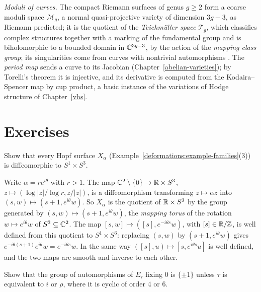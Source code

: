 \begin{remark}\label{deformations:remark-moduli-curves}
\emph{Moduli of curves.} The compact Riemann surfaces of genus $g \geq 2$ form a coarse moduli space $\mathcal{M}_g$, a normal quasi-projective variety of dimension $3g - 3$, as Riemann predicted; it is
the quotient of the \emph{Teichm\"uller space} $\mathcal{T}_g$, which classifies complex structures together with a marking of the fundamental group and is biholomorphic to a bounded domain in $\mathbb{C}^{3g - 3}$,
by the action of the \emph{mapping class group}; its singularities come from curves with nontrivial automorphisms \cite{harris-morrison}. The \emph{period map} sends a curve to its Jacobian
(Chapter~\ref{abelian-varieties}); by Torelli's theorem it is injective, and its derivative is computed from the Kodaira--Spencer map by cup product, a basic instance of the variations of Hodge structure
of Chapter~\ref{vhs}.
\end{remark}

\section{Exercises}\label{deformations:section-exercises}

\begin{exercise}\label{deformations:exercise-hopf}
Show that every Hopf surface $X_\alpha$ (Example~\ref{deformations:example-families}(3)) is diffeomorphic to $S^1 \times S^3$.
\end{exercise}

\begin{solution}
Write $\alpha = re^{i\theta}$ with $r > 1$. The map $\mathbb{C}^2 \setminus \{0\} \to \mathbb{R} \times S^3$, $z \mapsto (\log|z|/\log r, z/|z|)$, is a diffeomorphism transforming $z \mapsto \alpha z$ into
$(s, w) \mapsto (s + 1, e^{i\theta}w)$. So $X_\alpha$ is the quotient of $\mathbb{R} \times S^3$ by the group generated by $(s, w) \mapsto (s + 1, e^{i\theta}w)$, the \emph{mapping torus} of the rotation $w \mapsto e^{i\theta}w$ of $S^3 \subseteq \mathbb{C}^2$.
The map $[s, w] \mapsto ([s], e^{-i\theta s}w)$, with $[s] \in \mathbb{R}/\mathbb{Z}$, is well defined from this quotient to $S^1 \times S^3$: replacing $(s, w)$ by $(s + 1, e^{i\theta}w)$ gives
$e^{-i\theta(s + 1)}e^{i\theta}w = e^{-i\theta s}w$. In the same way $([s], u) \mapsto [s, e^{i\theta s}u]$ is well defined, and the two maps are smooth and inverse to each other.
\end{solution}

\begin{exercise}\label{deformations:exercise-automorphisms-elliptic}
Show that the group of automorphisms of $E_\tau$ fixing $0$ is $\{\pm1\}$ unless $\tau$ is equivalent to $i$ or $\rho$, where it is cyclic of order $4$ or $6$.
\end{exercise}

